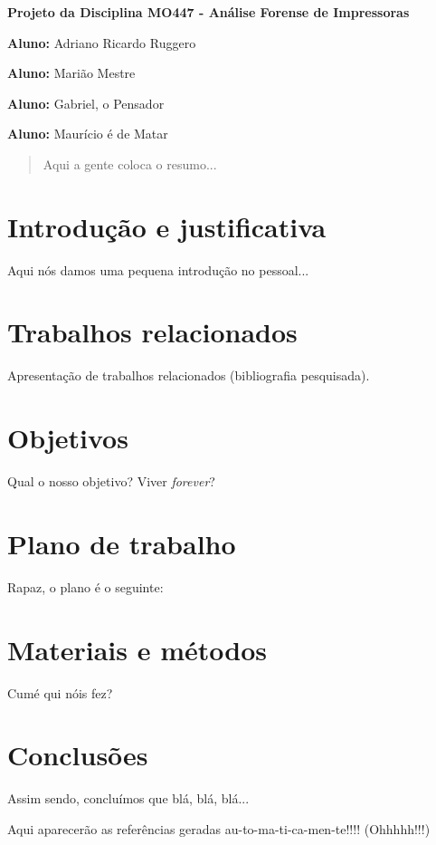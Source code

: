 \documentclass[12pt,twoside,a4paper]{article}
\begin{document}
\vskip 15mm

\begin{center} 
\textbf{Projeto da Disciplina MO447 - Análise Forense de Impressoras}
\end{center}

\vskip 5mm

\textbf{Aluno:} Adriano Ricardo Ruggero

\textbf{Aluno:} Marião Mestre

\textbf{Aluno:} Gabriel, o Pensador

\textbf{Aluno:} Maurício é de Matar

\vskip 20mm

\begin{abstract}

Aqui a gente coloca o resumo...

\end{abstract}

\newpage
\pagestyle{plain}
\headheight 0.0cm
\headsep 0.0cm
\footskip 2.2cm

\section{Introdução e justificativa}
\label{sec:introduction}

Aqui nós damos uma pequena introdução no pessoal...

\section{Trabalhos relacionados}
\label{sec:related}

Apresentação de trabalhos relacionados (bibliografia pesquisada).	


\section{Objetivos}
\label{sec:objects}

Qual o nosso objetivo? Viver \textit{forever}?

\section{Plano de trabalho}
\label{sec:plan}

Rapaz, o plano é o seguinte:
 
\section{Materiais e métodos}
\label{sec:materials}

Cumé qui nóis fez?	

\section{Conclusões}
\label{sec:conclusions}

Assim sendo, concluímos que blá, blá, blá...

{}


Aqui aparecerão as referências geradas au-to-ma-ti-ca-men-te!!!! (Ohhhhh!!!)
\end{document}
